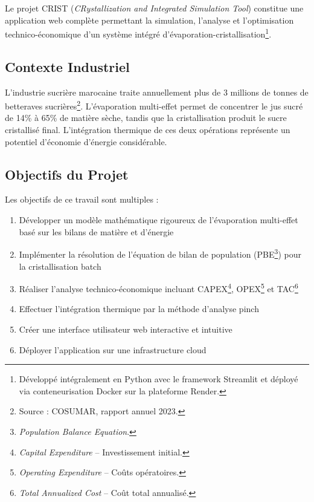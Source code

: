 \documentclass[12pt,a4paper,twoside]{article}
\begin{document}
Le projet CRIST (\textit{CRystallization and Integrated Simulation Tool}) constitue une application web complète permettant la simulation, l'analyse et l'optimisation technico-économique d'un système intégré d'évaporation-cristallisation\footnote{Développé intégralement en Python avec le framework Streamlit et déployé via conteneurisation Docker sur la plateforme Render.}.

\subsection{Contexte Industriel}

L'industrie sucrière marocaine traite annuellement plus de 3 millions de tonnes de betteraves sucrières\footnote{Source : COSUMAR, rapport annuel 2023.}. L'évaporation multi-effet permet de concentrer le jus sucré de 14\% à 65\% de matière sèche, tandis que la cristallisation produit le sucre cristallisé final. L'intégration thermique de ces deux opérations représente un potentiel d'économie d'énergie considérable.

\subsection{Objectifs du Projet}

Les objectifs de ce travail sont multiples :
\begin{enumerate}[label=\roman*., noitemsep]
    \item Développer un modèle mathématique rigoureux de l'évaporation multi-effet basé sur les bilans de matière et d'énergie
    \item Implémenter la résolution de l'équation de bilan de population (PBE\footnote{\textit{Population Balance Equation}.}) pour la cristallisation batch
    \item Réaliser l'analyse technico-économique incluant CAPEX\footnote{\textit{Capital Expenditure} -- Investissement initial.}, OPEX\footnote{\textit{Operating Expenditure} -- Coûts opératoires.} et TAC\footnote{\textit{Total Annualized Cost} -- Coût total annualisé.}
    \item Effectuer l'intégration thermique par la méthode d'analyse pinch
    \item Créer une interface utilisateur web interactive et intuitive
    \item Déployer l'application sur une infrastructure cloud
\end{enumerate}

\end{document}
